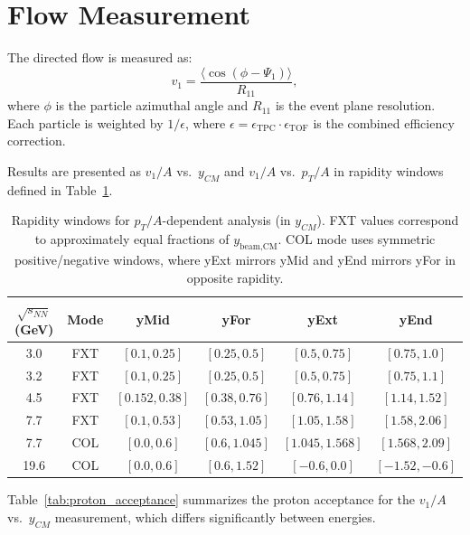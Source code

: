 \documentclass[aps,prc,preprint,superscriptaddress,nofootinbib]{revtex4-2}
\begin{document}
\section{Flow Measurement}
\label{sec:flow}

The directed flow is measured as:
\begin{equation}
    v_1 = \frac{\langle\cos(\phi - \Psi_1)\rangle}{R_{11}},
    \label{eq:v1}
\end{equation}
where $\phi$ is the particle azimuthal angle and $R_{11}$ is the event plane resolution. Each particle is weighted by $1/\epsilon$, where $\epsilon = \epsilon_{\text{TPC}} \cdot \epsilon_{\text{TOF}}$ is the combined efficiency correction.

Results are presented as $v_1/A$ vs.\ $y_{CM}$ and $v_1/A$ vs.\ $p_T/A$ in rapidity windows defined in Table~\ref{tab:rapidity_windows}.

\begin{table}[h]
\centering
\caption{Rapidity windows for $p_T/A$-dependent analysis (in $y_{CM}$). FXT values correspond to approximately equal fractions of $y_{\text{beam,CM}}$. COL mode uses symmetric positive/negative windows, where yExt mirrors yMid and yEnd mirrors yFor in opposite rapidity.}
\label{tab:rapidity_windows}
\begin{tabular}{cccccc}
\toprule
$\sqrt{s_{NN}}$ (GeV) & Mode & yMid & yFor & yExt & yEnd \\
\midrule
3.0  & FXT & $[0.1, 0.25]$  & $[0.25, 0.5]$  & $[0.5, 0.75]$   & $[0.75, 1.0]$   \\
3.2  & FXT & $[0.1, 0.25]$  & $[0.25, 0.5]$  & $[0.5, 0.75]$   & $[0.75, 1.1]$   \\
4.5  & FXT & $[0.152, 0.38]$ & $[0.38, 0.76]$ & $[0.76, 1.14]$  & $[1.14, 1.52]$  \\
7.7  & FXT & $[0.1, 0.53]$  & $[0.53, 1.05]$ & $[1.05, 1.58]$  & $[1.58, 2.06]$  \\
\midrule
7.7  & COL & $[0.0, 0.6]$   & $[0.6, 1.045]$ & $[1.045, 1.568]$ & $[1.568, 2.09]$ \\
19.6 & COL & $[0.0, 0.6]$   & $[0.6, 1.52]$  & $[-0.6, 0.0]$   & $[-1.52, -0.6]$ \\
\bottomrule
\end{tabular}
\end{table}

Table~\ref{tab:proton_acceptance} summarizes the proton acceptance for the $v_1/A$ vs.\ $y_{CM}$ measurement, which differs significantly between energies.
\end{document}
